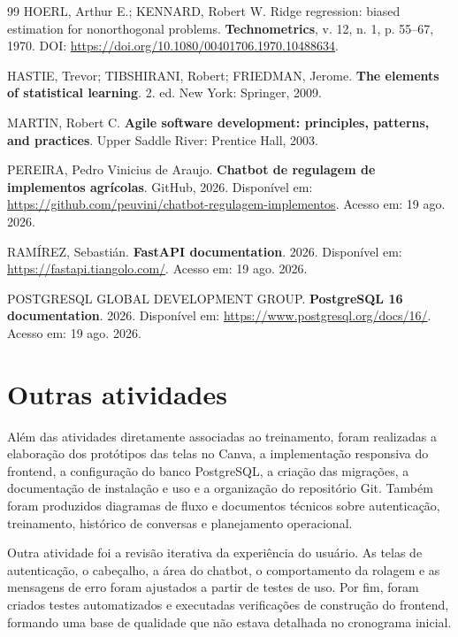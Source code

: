 \documentclass[12pt,a4paper]{article}
\begin{document}
\begin{thebibliography}{99}
HOERL, Arthur E.; KENNARD, Robert W. Ridge regression: biased estimation for nonorthogonal problems. \textbf{Technometrics}, v. 12, n. 1, p. 55--67, 1970. DOI: \url{https://doi.org/10.1080/00401706.1970.10488634}.

HASTIE, Trevor; TIBSHIRANI, Robert; FRIEDMAN, Jerome. \textbf{The elements of statistical learning}. 2. ed. New York: Springer, 2009.

MARTIN, Robert C. \textbf{Agile software development: principles, patterns, and practices}. Upper Saddle River: Prentice Hall, 2003.

PEREIRA, Pedro Vinicius de Araujo. \textbf{Chatbot de regulagem de implementos agrícolas}. GitHub, 2026. Disponível em: \url{https://github.com/peuvini/chatbot-regulagem-implementos}. Acesso em: 19 ago. 2026.

RAMÍREZ, Sebastián. \textbf{FastAPI documentation}. 2026. Disponível em: \url{https://fastapi.tiangolo.com/}. Acesso em: 19 ago. 2026.

POSTGRESQL GLOBAL DEVELOPMENT GROUP. \textbf{PostgreSQL 16 documentation}. 2026. Disponível em: \url{https://www.postgresql.org/docs/16/}. Acesso em: 19 ago. 2026.

\end{thebibliography}
\fussy

\section{Outras atividades}

Além das atividades diretamente associadas ao treinamento, foram realizadas a elaboração dos protótipos das telas no Canva, a implementação responsiva do frontend, a configuração do banco PostgreSQL, a criação das migrações, a documentação de instalação e uso e a organização do repositório Git. Também foram produzidos diagramas de fluxo e documentos técnicos sobre autenticação, treinamento, histórico de conversas e planejamento operacional.

Outra atividade foi a revisão iterativa da experiência do usuário. As telas de autenticação, o cabeçalho, a área do chatbot, o comportamento da rolagem e as mensagens de erro foram ajustados a partir de testes de uso. Por fim, foram criados testes automatizados e executadas verificações de construção do frontend, formando uma base de qualidade que não estava detalhada no cronograma inicial.
\end{document}
